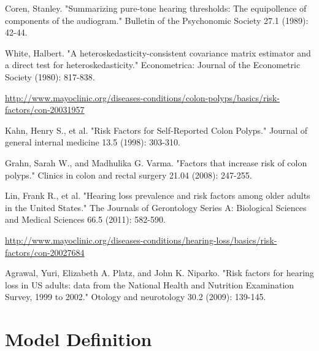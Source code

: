 \documentclass[paper=a4, fontsize=11pt]{scrartcl} %
\numberwithin{equation}{section} %
\numberwithin{figure}{section} %
\numberwithin{table}{section} %
\begin{document}
\begin{thebibliography}{9}
Coren, Stanley. "Summarizing pure-tone hearing thresholds: The equipollence of components of the audiogram." Bulletin of the Psychonomic Society 27.1 (1989): 42-44.

White, Halbert. "A heteroskedasticity-consistent covariance matrix estimator and a direct test for heteroskedasticity." Econometrica: Journal of the Econometric Society (1980): 817-838.

\url{http://www.mayoclinic.org/diseases-conditions/colon-polyps/basics/risk-factors/con-20031957}

Kahn, Henry S., et al. "Risk Factors for Self‐Reported Colon Polyps." Journal of general internal medicine 13.5 (1998): 303-310.

Grahn, Sarah W., and Madhulika G. Varma. "Factors that increase risk of colon polyps." Clinics in colon and rectal surgery 21.04 (2008): 247-255.

Lin, Frank R., et al. "Hearing loss prevalence and risk factors among older adults in the United States." The Journals of Gerontology Series A: Biological Sciences and Medical Sciences 66.5 (2011): 582-590.

\url{http://www.mayoclinic.org/diseases-conditions/hearing-loss/basics/risk-factors/con-20027684}

Agrawal, Yuri, Elizabeth A. Platz, and John K. Niparko. "Risk factors for hearing loss in US adults: data from the National Health and Nutrition Examination Survey, 1999 to 2002." Otology and neurotology 30.2 (2009): 139-145.
 
\end{thebibliography}

\pagebreak

\appendix

\section{Model Definition}
\label{sec:appendix_model_definition}
\end{document}
